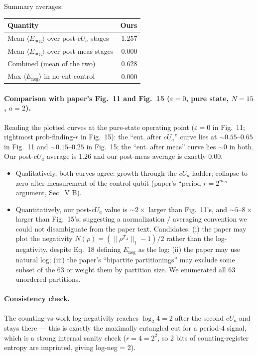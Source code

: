 \documentclass[11pt]{article}
\begin{document}
Summary averages:

\begin{center}
\begin{tabular}{lr}
\toprule
Quantity & Ours \\
\midrule
Mean $\langle E_{\mathrm{neg}}\rangle$ over post-$cU_a$ stages & 1.257 \\
Mean $\langle E_{\mathrm{neg}}\rangle$ over post-meas stages    & 0.000 \\
Combined (mean of the two)                                       & 0.628 \\
Max $\langle E_{\mathrm{neg}}\rangle$ in no-ent control          & 0.000 \\
\bottomrule
\end{tabular}
\end{center}

\paragraph{Comparison with paper's Fig.~11 and Fig.~15 ($\varepsilon = 0$,
pure state, $N=15$, $a=2$).}
Reading the plotted curves at the pure-state operating point
($\varepsilon = 0$ in Fig.~11; rightmost prob-finding-$r$ in Fig.~15):
the ``ent. after $cU_a$'' curve lies at $\sim 0.55$--$0.65$ in Fig.~11
and $\sim 0.15$--$0.25$ in Fig.~15; the ``ent. after meas'' curve lies
$\sim 0$ in both.  Our post-$cU_a$ average is $1.26$ and our post-meas
average is exactly $0.00$.

\begin{itemize}
\item Qualitatively, both curves agree: growth through the $cU_a$
  ladder; collapse to zero after measurement of the control qubit
  (paper's ``period $r = 2^m$'' argument, Sec.~V B).
\item Quantitatively, our post-$cU_a$ value is $\sim$$2\times$ larger
  than Fig.~11's, and $\sim$$5\text{--}8\times$ larger than Fig.~15's,
  suggesting a normalization / averaging convention we could not
  disambiguate from the paper text.  Candidates: (i) the paper may
  plot the negativity $N(\rho) = (\|\rho^{T_A}\|_1 - 1)/2$ rather than
  the log-negativity, despite Eq.~18 defining $E_{\mathrm{neg}}$ as the
  log; (ii) the paper may use natural log; (iii) the paper's
  ``bipartite partitionings'' may exclude some subset of the 63 or
  weight them by partition size.  We enumerated all 63 unordered
  partitions.
\end{itemize}

\paragraph{Consistency check.}
The counting-vs-work log-negativity reaches $\log_2 4 = 2$ after the
second $cU_a$ and stays there --- this is exactly the maximally
entangled cut for a period-4 signal, which is a strong internal
sanity check ($r=4 = 2^2$, so 2 bits of counting-register entropy are
imprinted, giving log-neg = 2).
\end{document}

